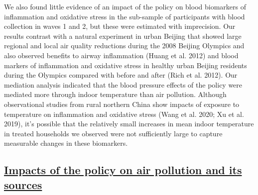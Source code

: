 \documentclass[
  letterpaper,
  DIV=11,
  numbers=noendperiod]{scrartcl}
\providecommand{\DIFadd}[1]{{\protect\color{blue}\underline{#1}}} %
\providecommand{\DIFaddbegin}{} %
\providecommand{\DIFaddend}{} %
\providecommand{\DIFdelbegin}{} %
\providecommand{\DIFdelend}{} %
\newcommand{\DIFscaledelfig}{0.5}
\newlength{\DIFdelgraphicswidth} %
\newlength{\DIFdelgraphicsheight} %
\newcommand{\DIFaddincludegraphics}[2][]{{\color{blue}\fbox{\DIFOincludegraphics[#1]{#2}}}} %
\newcommand{\DIFdelincludegraphics}[2][]{%
\sbox{\DIFdelgraphicsbox}{\DIFOincludegraphics[#1]{#2}}%
\settoboxwidth{\DIFdelgraphicswidth}{\DIFdelgraphicsbox} %
\settoboxtotalheight{\DIFdelgraphicsheight}{\DIFdelgraphicsbox} %
\scalebox{\DIFscaledelfig}{%
\parbox[b]{\DIFdelgraphicswidth}{\usebox{\DIFdelgraphicsbox}\\[-\baselineskip] \rule{\DIFdelgraphicswidth}{0em}}\llap{\resizebox{\DIFdelgraphicswidth}{\DIFdelgraphicsheight}{%
\setlength{\unitlength}{\DIFdelgraphicswidth}%
\begin{picture}(1,1)%
\thicklines\linethickness{2pt} %
{\color[rgb]{1,0,0}\put(0,0){\framebox(1,1){}}}%
{\color[rgb]{1,0,0}\put(0,0){\line( 1,1){1}}}%
{\color[rgb]{1,0,0}\put(0,1){\line(1,-1){1}}}%
\end{picture}%
}\hspace*{3pt}}} %
} %
\DeclareRobustCommand{\DIFaddbegin}{\DIFOaddbegin \let\includegraphics\DIFaddincludegraphics} %
\DeclareRobustCommand{\DIFaddend}{\DIFOaddend \let\includegraphics\DIFOincludegraphics} %
\DeclareRobustCommand{\DIFdelbegin}{\DIFOdelbegin \let\includegraphics\DIFdelincludegraphics} %
\DeclareRobustCommand{\DIFdelend}{\DIFOaddend \let\includegraphics\DIFOincludegraphics} %
\begin{document}
We also found little evidence of an impact of the policy on blood
biomarkers of inflammation and oxidative stress in the sub-sample of
participants with blood collection in waves 1 and 2, but these were
estimated with imprecision. Our results contrast with a natural
experiment in urban Beijing that showed large regional and local air
quality reductions during the 2008 Beijing Olympics and also observed
benefits to airway inflammation (Huang et al. 2012) and blood markers of
inflammation and oxidative stress in healthy urban Beijing residents
during the Olympics compared with before and after (Rich et al. 2012).
Our mediation analysis indicated that the blood pressure effects of the
policy were mediated more through indoor temperature than air pollution.
Although observational studies from rural northern China show impacts of
exposure to temperature on inflammation and oxidative stress (Wang et
al. 2020; Xu et al. 2019), it's possible that the relatively small
increases in mean indoor temperature in treated households we observed
were not sufficiently large to capture measurable changes in these
biomarkers.

\DIFdelbegin %
\DIFdelend \DIFaddbegin \subsection{\DIFadd{Impacts of the policy on air pollution and its
sources}}\label{impacts-of-the-policy-on-air-pollution-and-its-sources}
\DIFaddend 
\end{document}
